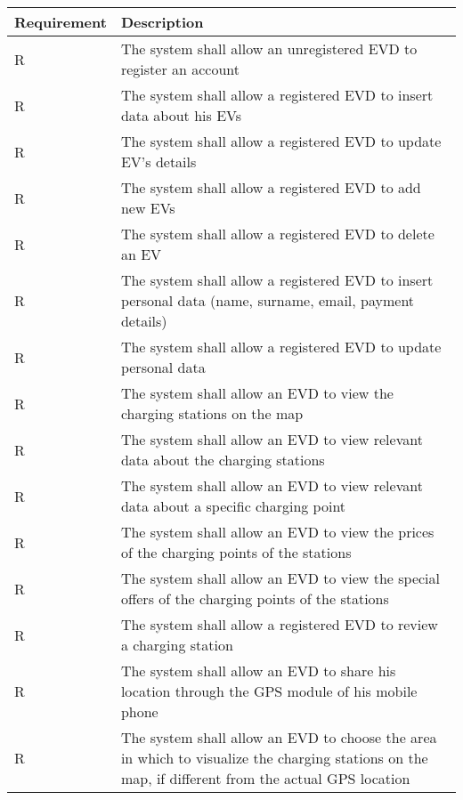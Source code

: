\setcounter{r}{1}
\newcommand{\rcount}{\ther\stepcounter{r}}
\begin{center}
    \begin{longtable}[H]{|p{0.2\linewidth}|p{0.8\linewidth}|}
     \hline
     \textbf{Requirement} & \textbf{Description}\\
     \hline
     R\rcount & The system shall allow an unregistered EVD to register an account\\
     \hline
     R\rcount & The system shall allow a registered EVD to insert data about his EVs \\
     \hline
     R\rcount & The system shall allow a registered EVD to update EV's details\\
     \hline
     R\rcount & The system shall allow a registered EVD to add new EVs \\
     \hline
     R\rcount & The system shall allow a registered EVD to delete an EV\\
     \hline
     R\rcount & The system shall allow a registered EVD to insert personal data (name, surname, email, payment details)\\
     \hline
     R\rcount & The system shall allow a registered EVD to update personal data\\
     \hline
     R\rcount & The system shall allow an EVD to view the charging stations on the map\\
     \hline
     R\rcount & The system shall allow an EVD to view relevant data about the charging stations\\
     \hline
     R\rcount & The system shall allow an EVD to view relevant data about a specific charging point\\
     \hline
     R\rcount & The system shall allow an EVD to view the prices of the charging points of the stations\\
     \hline
     R\rcount & The system shall allow an EVD to view the special offers of the charging points of the stations\\
     \hline
     R\rcount & The system shall allow a registered EVD to review a charging station \\
     \hline
     R\rcount & The system shall allow an EVD to share his location through the GPS module of his mobile phone\\
     \hline
     R\rcount & The system shall allow an EVD to choose the area in which to visualize the charging stations on the map, if different from the actual GPS location \\

\end{longtable}
\end{center}

